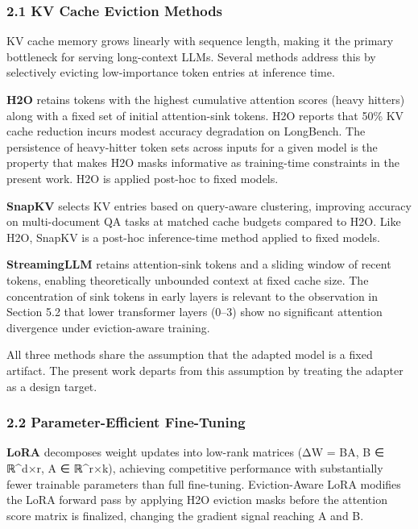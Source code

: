 
\subsubsection{2.1 KV Cache Eviction Methods}

KV cache memory grows linearly with sequence length, making it the primary bottleneck for serving long-context LLMs. Several methods address this by selectively evicting low-importance token entries at inference time.

\textbf{H2O} \citep{Zhangetal2023} retains tokens with the highest cumulative attention scores (heavy hitters) along with a fixed set of initial attention-sink tokens. H2O reports that 50\% KV cache reduction incurs modest accuracy degradation on LongBench. The persistence of heavy-hitter token sets across inputs for a given model is the property that makes H2O masks informative as training-time constraints in the present work. H2O is applied post-hoc to fixed models.

\textbf{SnapKV} \citep{Lietal2024} selects KV entries based on query-aware clustering, improving accuracy on multi-document QA tasks at matched cache budgets compared to H2O. Like H2O, SnapKV is a post-hoc inference-time method applied to fixed models.

\textbf{StreamingLLM} \citep{Xiaoetal2023} retains attention-sink tokens and a sliding window of recent tokens, enabling theoretically unbounded context at fixed cache size. The concentration of sink tokens in early layers is relevant to the observation in Section 5.2 that lower transformer layers (0–3) show no significant attention divergence under eviction-aware training.

All three methods share the assumption that the adapted model is a fixed artifact. The present work departs from this assumption by treating the adapter as a design target.

\subsubsection{2.2 Parameter-Efficient Fine-Tuning}

\textbf{LoRA} \citep{Huetal2022} decomposes weight updates into low-rank matrices (ΔW = BA, B ∈ ℝ^{d×r}, A ∈ ℝ^{r×k}), achieving competitive performance with substantially fewer trainable parameters than full fine-tuning. Eviction-Aware LoRA modifies the LoRA forward pass by applying H2O eviction masks before the attention score matrix is finalized, changing the gradient signal reaching A and B.

